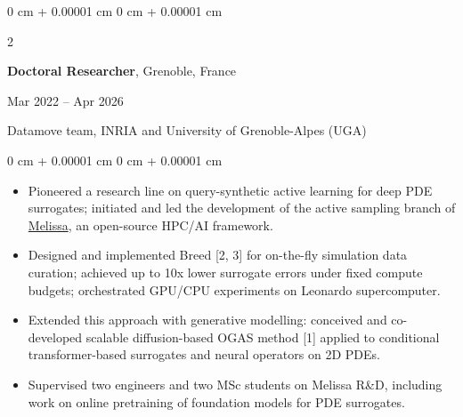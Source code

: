 \documentclass[10pt, letterpaper]{article}
\newenvironment{highlights}{
    \begin{itemize}[
        topsep=0.10 cm,
        parsep=0.10 cm,
        partopsep=0pt,
        itemsep=0pt,
        leftmargin=0 cm + 10pt
    ]
}{
    \end{itemize}
} %
\newenvironment{onecolentry}{
    \begin{adjustwidth}{
        0 cm + 0.00001 cm
    }{
        0 cm + 0.00001 cm
    }
}{
    \end{adjustwidth}
} %
\newenvironment{twocolentry}[2][]{
    \onecolentry
    \def\secondColumn{#2}
    \setcolumnwidth{\fill, 4.5 cm}
    \begin{paracol}{2}
}{
    \switchcolumn \raggedleft \secondColumn
    \end{paracol}
    \endonecolentry
} %
\let\hrefWithoutArrow\href
\begin{document}
        \begin{twocolentry}{Mar 2022 -- Apr 2026}
            \textbf{Doctoral Researcher}, Grenoble, France
        \end{twocolentry}
        Datamove team, INRIA and University of Grenoble-Alpes (UGA)
        \vspace{0.10 cm}
        \begin{onecolentry}
            \begin{highlights}
                \item Pioneered a research line on query-synthetic active learning for deep PDE surrogates; initiated and led the development of the active sampling branch of \hrefWithoutArrow{https://melissa.gitlabpages.inria.fr/melissa/}{Melissa}, an open-source HPC/AI framework.
                \item Designed and implemented Breed [2, 3] for on-the-fly simulation data curation; achieved up to 10x lower surrogate errors under fixed compute budgets; orchestrated GPU/CPU experiments on Leonardo supercomputer.
                \item Extended this approach with generative modelling: conceived and co-developed scalable diffusion-based OGAS method [1] applied to conditional transformer-based surrogates and neural operators on 2D PDEs.
                \item Supervised two engineers and two MSc students on Melissa R\&D, including work on online pretraining of foundation models for PDE surrogates.
            \end{highlights}
        \end{onecolentry}
\end{document}
